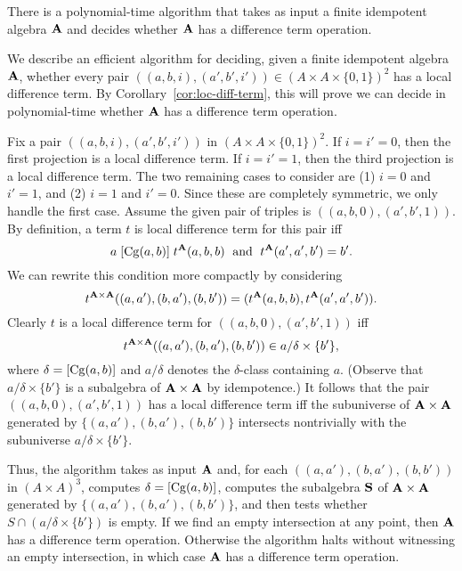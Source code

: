 \documentclass[12pt,xcolor=dvipsnames%
   ]{beamer}
\begin{document}
\begin{frame}
  
\begin{corollary}
  \label{cor:algor-1}
  There is a polynomial-time algorithm that takes as input
  a finite idempotent algebra $\mathbf{A}$ and decides whether
  $\mathbf{A}$ has a difference term operation.
\end{corollary}

\begin{note}
  We describe an efficient algorithm for deciding,
  given a finite idempotent algebra $\mathbf{A}$,
  whether every pair $((a,b,i), (a',b',i')) \in (A\times A \times \{0,1\})^2$ has a local
  difference term.  By Corollary~\ref{cor:loc-diff-term}, this will prove we
  can decide in polynomial-time whether $\mathbf{A}$ has a difference term operation.

  Fix a pair
  $((a,b,i), (a',b',i'))$ in $(A\times A \times \{0,1\})^2$. If $i = i' = 0$,
  then the first projection is a local difference term. If $i = i' = 1$,  
    then the third projection is a local difference term. The two remaining cases to
    consider are (1) $i = 0$ and $i'=1$, and (2)
    $i = 1$ and $i'=0$. Since these are completely symmetric, we only handle the
    first case. Assume  the given pair of triples is
    $((a,b,0), (a',b',1))$.  By definition, a term $t$ is local difference term
    for this pair iff
    \[
    a\mathrel{[\operatorname{Cg}(a,b)]} t^{\mathbf{A}}(a,b,b) \; \text{ and } \;
    t^{\mathbf{A}}(a',a',b') = b'.
    \]
    We can rewrite this condition more compactly by
    considering 
    \[t^{\mathbf{A}\times \mathbf{A}}((a,a'), (b,a'), (b,b')) =
    (t^{\mathbf{A}}(a,b,b),t^{\mathbf{A}}(a',a',b')).\]
    Clearly $t$ is a local difference term for
    $((a,b,0), (a',b',1))$ iff
    \[
    t^{\mathbf{A}\times \mathbf{A}}((a,a'), (b,a'), (b,b'))\in a/\delta \times \{b'\},
    \]
    where $\delta = [\operatorname{Cg}(a,b)]$ and $a/\delta$ denotes the
    $\delta$-class containing $a$.
    (Observe that $a/\delta \times \{b'\}$ is a subalgebra of $\mathbf{A} \times \mathbf{A}$
    by idempotence.)
    It follows that the pair
    $((a,b,0), (a',b',1))$ has a local difference term iff
    the subuniverse of $\mathbf{A}\times \mathbf{A}$ generated by
    $\{(a,a'), (b,a'), (b,b')\}$ intersects nontrivially with the subuniverse
    $a/\delta \times \{b'\}$.

    Thus, the algorithm takes as input $\mathbf{A}$ and, for each 
    $((a,a'), (b,a'), (b,b'))$ in $(A\times A)^3$, computes
    $\delta = [\operatorname{Cg}(a,b)]$, computes the subalgebra
    $\mathbf{S}$ of $\mathbf{A}\times \mathbf{A}$ generated by
    $\{(a,a'), (b,a'), (b,b')\}$, and then
    tests whether $S \cap (a/\delta \times \{b'\})$ is empty.
    If we find an empty intersection at any point, then
    $\mathbf{A}$ has a difference term operation.
    Otherwise the algorithm halts without witnessing an empty
    intersection, in which case $\mathbf{A}$ has a difference term operation.


\end{note}
\end{frame}
\end{document}
